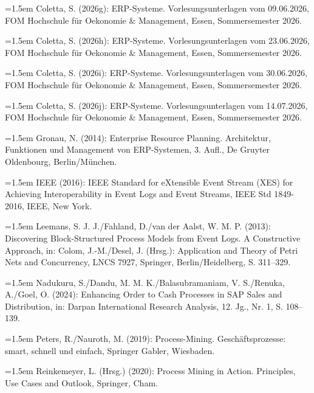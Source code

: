 \noindent\hangindent=1.5em Coletta, S. (2026g): ERP-Systeme. Vorlesungsunterlagen vom 09.06.2026, FOM Hochschule für Oekonomie \& Management, Essen, Sommersemester 2026.\par

\noindent\hangindent=1.5em Coletta, S. (2026h): ERP-Systeme. Vorlesungsunterlagen vom 23.06.2026, FOM Hochschule für Oekonomie \& Management, Essen, Sommersemester 2026.\par

\noindent\hangindent=1.5em Coletta, S. (2026i): ERP-Systeme. Vorlesungsunterlagen vom 30.06.2026, FOM Hochschule für Oekonomie \& Management, Essen, Sommersemester 2026.\par

\noindent\hangindent=1.5em Coletta, S. (2026j): ERP-Systeme. Vorlesungsunterlagen vom 14.07.2026, FOM Hochschule für Oekonomie \& Management, Essen, Sommersemester 2026.\par

\noindent\hangindent=1.5em Gronau, N. (2014): Enterprise Resource Planning. Architektur, Funktionen und Management von ERP-Systemen, 3. Aufl., De Gruyter Oldenbourg, Berlin/München.\par

\noindent\hangindent=1.5em IEEE (2016): IEEE Standard for eXtensible Event Stream (XES) for Achieving Interoperability in Event Logs and Event Streams, IEEE Std 1849-2016, IEEE, New York.\par

\noindent\hangindent=1.5em Leemans, S. J. J./Fahland, D./van der Aalst, W. M. P. (2013): Discovering Block-Structured Process Models from Event Logs. A Constructive Approach, in: Colom, J.-M./Desel, J. (Hrsg.): Application and Theory of Petri Nets and Concurrency, LNCS 7927, Springer, Berlin/Heidelberg, S. 311--329.\par

\noindent\hangindent=1.5em Nadukuru, S./Dandu, M. M. K./Balasubramaniam, V. S./Renuka, A./Goel, O. (2024): Enhancing Order to Cash Processes in SAP Sales and Distribution, in: Darpan International Research Analysis, 12. Jg., Nr. 1, S. 108--139.\par

\noindent\hangindent=1.5em Peters, R./Nauroth, M. (2019): Process-Mining. Geschäftsprozesse: smart, schnell und einfach, Springer Gabler, Wiesbaden.\par

\noindent\hangindent=1.5em Reinkemeyer, L. (Hrsg.) (2020): Process Mining in Action. Principles, Use Cases and Outlook, Springer, Cham.\par

